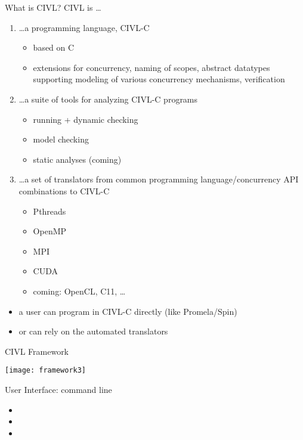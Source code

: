 \documentclass[t]{beamer}
\begin{document}
\begin{frame}{What is CIVL?}
  CIVL is \ldots
  \begin{enumerate}
  \item \ldots a programming language, \alert{CIVL-C}
    \begin{itemize}
    \item based on C
    \item extensions for concurrency, naming of scopes, abstract
      datatypes supporting modeling of various concurrency mechanisms,
      verification
    \end{itemize}
  \item \ldots a suite of tools for analyzing CIVL-C programs
    \begin{itemize}
    \item running + dynamic checking
    \item model checking
    \item static analyses (coming)
    \end{itemize}
  \item \ldots a set of translators from common programming
    language/concurrency API combinations to CIVL-C
    \begin{itemize}
    \item Pthreads
    \item OpenMP
    \item MPI
    \item CUDA
    \item coming: OpenCL, C11, \ldots
    \end{itemize}
  \end{enumerate}

  \begin{itemize}
  \item a user can program in CIVL-C directly (like Promela/Spin)
  \item or can rely on the automated translators
  \end{itemize}
\end{frame}


\begin{frame}{CIVL Framework}
  \begin{center}
    \texttt{[image: framework3]}
  \end{center}

  User Interface: command line
  \begin{itemize}
  \item {}
  \item {}
  \item {}
  \end{itemize}
\end{frame}
\end{document}
